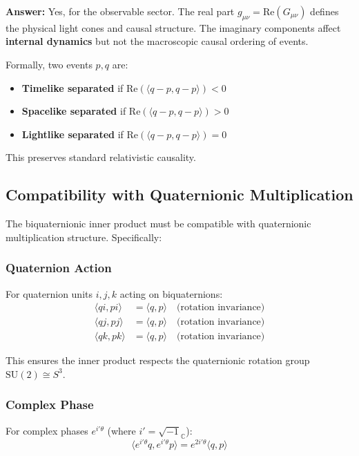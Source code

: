 \textbf{Answer:} Yes, for the observable sector. The real part $g_{\mu\nu} = \text{Re}(G_{\mu\nu})$ defines the physical light cones and causal structure. The imaginary components affect \textbf{internal dynamics} but not the macroscopic causal ordering of events.

Formally, two events $p, q$ are:
\begin{itemize}
\item \textbf{Timelike separated} if $\text{Re}(\langle q-p, q-p \rangle) < 0$
\item \textbf{Spacelike separated} if $\text{Re}(\langle q-p, q-p \rangle) > 0$
\item \textbf{Lightlike separated} if $\text{Re}(\langle q-p, q-p \rangle) = 0$
\end{itemize}

This preserves standard relativistic causality.

\subsection{Compatibility with Quaternionic Multiplication}

The biquaternionic inner product must be compatible with quaternionic multiplication structure. Specifically:

\subsubsection{Quaternion Action}

For quaternion units $i, j, k$ acting on biquaternions:
\begin{align}
\langle qi, pi \rangle &= \langle q, p \rangle \quad \text{(rotation invariance)} \\
\langle qj, pj \rangle &= \langle q, p \rangle \quad \text{(rotation invariance)} \\
\langle qk, pk \rangle &= \langle q, p \rangle \quad \text{(rotation invariance)}
\end{align}

This ensures the inner product respects the quaternionic rotation group $\text{SU}(2) \cong S^3$.

\subsubsection{Complex Phase}

For complex phases $e^{i'\theta}$ (where $i' = \sqrt{-1}_{\mathbb{C}}$):
\begin{equation}
\langle e^{i'\theta} q, e^{i'\theta} p \rangle = e^{2i'\theta} \langle q, p \rangle
\end{equation}

